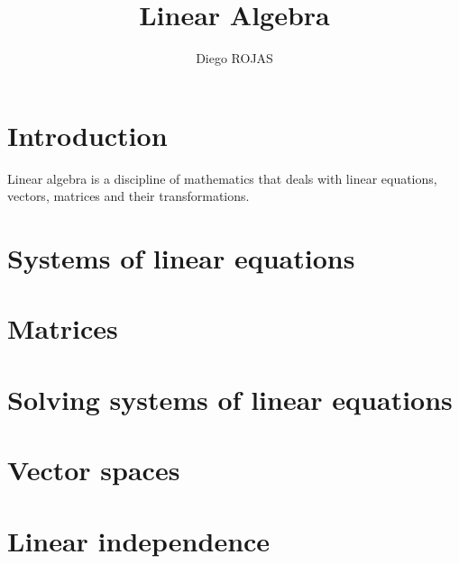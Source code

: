 \documentclass[12pt]{article}
\title{Linear Algebra}
\author{Diego ROJAS}
\begin{document}
\maketitle
	
\section{Introduction}

Linear algebra is a discipline of mathematics that deals with linear equations, vectors, matrices and their transformations.

\section{Systems of linear equations}


\section{Matrices}

\section{Solving systems of linear equations}

\section{Vector spaces}

\section{Linear independence}
\end{document}
